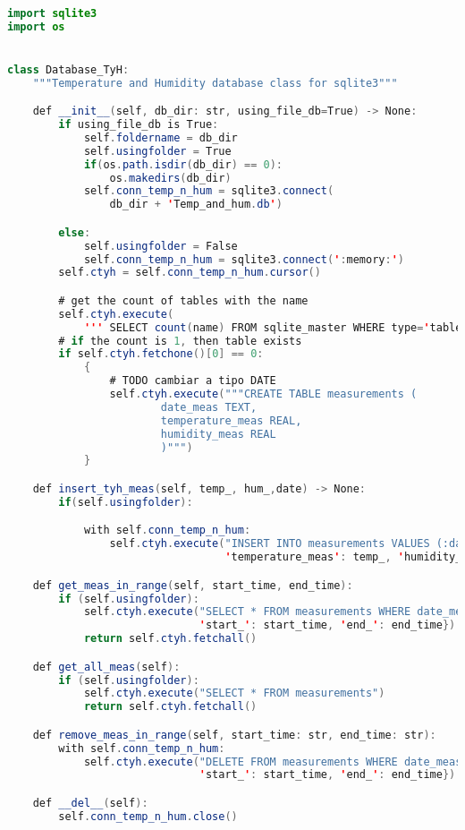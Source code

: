 
\begin{lstlisting}[language=Java]

import sqlite3
import os


class Database_TyH:
    """Temperature and Humidity database class for sqlite3"""

    def __init__(self, db_dir: str, using_file_db=True) -> None:
        if using_file_db is True:
            self.foldername = db_dir
            self.usingfolder = True
            if(os.path.isdir(db_dir) == 0):
                os.makedirs(db_dir)
            self.conn_temp_n_hum = sqlite3.connect(
                db_dir + 'Temp_and_hum.db')

        else:
            self.usingfolder = False
            self.conn_temp_n_hum = sqlite3.connect(':memory:')
        self.ctyh = self.conn_temp_n_hum.cursor()

        # get the count of tables with the name
        self.ctyh.execute(
            ''' SELECT count(name) FROM sqlite_master WHERE type='table' AND name='measurements' ''')
        # if the count is 1, then table exists
        if self.ctyh.fetchone()[0] == 0:
            {
                # TODO cambiar a tipo DATE
                self.ctyh.execute("""CREATE TABLE measurements (
                        date_meas TEXT,
                        temperature_meas REAL,
                        humidity_meas REAL
                        )""")
            }

    def insert_tyh_meas(self, temp_, hum_,date) -> None:
        if(self.usingfolder):

            with self.conn_temp_n_hum:
                self.ctyh.execute("INSERT INTO measurements VALUES (:date_, :temperature_meas, :humidity_meas)", {
                                  'temperature_meas': temp_, 'humidity_meas': hum_, 'date_': date})

    def get_meas_in_range(self, start_time, end_time):
        if (self.usingfolder):
            self.ctyh.execute("SELECT * FROM measurements WHERE date_meas BETWEEN (:start_) AND (:end_)", {
                              'start_': start_time, 'end_': end_time})
            return self.ctyh.fetchall()

    def get_all_meas(self):
        if (self.usingfolder):
            self.ctyh.execute("SELECT * FROM measurements")
            return self.ctyh.fetchall()

    def remove_meas_in_range(self, start_time: str, end_time: str):
        with self.conn_temp_n_hum:
            self.ctyh.execute("DELETE FROM measurements WHERE date_meas BETWEEN (:start_) AND (:end_)", {
                              'start_': start_time, 'end_': end_time})

    def __del__(self):
        self.conn_temp_n_hum.close()

\end{lstlisting}

